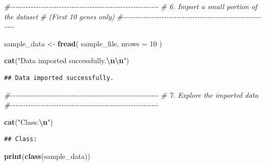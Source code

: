 \documentclass[
]{article}
\newenvironment{Shaded}{\begin{snugshade}}{\end{snugshade}}
\newcommand{\AttributeTok}[1]{\textcolor[rgb]{0.13,0.29,0.53}{#1}}
\newcommand{\CommentTok}[1]{\textcolor[rgb]{0.56,0.35,0.01}{\textit{#1}}}
\newcommand{\DecValTok}[1]{\textcolor[rgb]{0.00,0.00,0.81}{#1}}
\newcommand{\FunctionTok}[1]{\textcolor[rgb]{0.13,0.29,0.53}{\textbf{#1}}}
\newcommand{\NormalTok}[1]{#1}
\newcommand{\OtherTok}[1]{\textcolor[rgb]{0.56,0.35,0.01}{#1}}
\newcommand{\SpecialCharTok}[1]{\textcolor[rgb]{0.81,0.36,0.00}{\textbf{#1}}}
\newcommand{\StringTok}[1]{\textcolor[rgb]{0.31,0.60,0.02}{#1}}
\begin{document}
\begin{Shaded}
\begin{Highlighting}[]
\CommentTok{\#{-}{-}{-}{-}{-}{-}{-}{-}{-}{-}{-}{-}{-}{-}{-}{-}{-}{-}{-}{-}{-}{-}{-}{-}{-}{-}{-}{-}{-}{-}{-}{-}{-}{-}{-}{-}{-}{-}{-}{-}{-}{-}{-}{-}{-}{-}{-}{-}{-}{-}{-}{-}{-}{-}{-}{-}{-}{-}}
\CommentTok{\# 6. Import a small portion of the dataset}
\CommentTok{\#    (First 10 genes only)}
\CommentTok{\#{-}{-}{-}{-}{-}{-}{-}{-}{-}{-}{-}{-}{-}{-}{-}{-}{-}{-}{-}{-}{-}{-}{-}{-}{-}{-}{-}{-}{-}{-}{-}{-}{-}{-}{-}{-}{-}{-}{-}{-}{-}{-}{-}{-}{-}{-}{-}{-}{-}{-}{-}{-}{-}{-}{-}{-}{-}{-}}

\NormalTok{sample\_data }\OtherTok{\textless{}{-}} \FunctionTok{fread}\NormalTok{(}
\NormalTok{  sample\_file,}
  \AttributeTok{nrows =} \DecValTok{10}
\NormalTok{)}

\FunctionTok{cat}\NormalTok{(}\StringTok{"Data imported successfully.}\SpecialCharTok{\textbackslash{}n\textbackslash{}n}\StringTok{"}\NormalTok{)}
\end{Highlighting}
\end{Shaded}

\begin{verbatim}
## Data imported successfully.
\end{verbatim}

\begin{Shaded}
\begin{Highlighting}[]
\CommentTok{\#{-}{-}{-}{-}{-}{-}{-}{-}{-}{-}{-}{-}{-}{-}{-}{-}{-}{-}{-}{-}{-}{-}{-}{-}{-}{-}{-}{-}{-}{-}{-}{-}{-}{-}{-}{-}{-}{-}{-}{-}{-}{-}{-}{-}{-}{-}{-}{-}{-}{-}{-}{-}{-}{-}{-}{-}{-}{-}}
\CommentTok{\# 7. Explore the imported data}
\CommentTok{\#{-}{-}{-}{-}{-}{-}{-}{-}{-}{-}{-}{-}{-}{-}{-}{-}{-}{-}{-}{-}{-}{-}{-}{-}{-}{-}{-}{-}{-}{-}{-}{-}{-}{-}{-}{-}{-}{-}{-}{-}{-}{-}{-}{-}{-}{-}{-}{-}{-}{-}{-}{-}{-}{-}{-}{-}{-}{-}}

\FunctionTok{cat}\NormalTok{(}\StringTok{"Class:}\SpecialCharTok{\textbackslash{}n}\StringTok{"}\NormalTok{)}
\end{Highlighting}
\end{Shaded}

\begin{verbatim}
## Class:
\end{verbatim}

\begin{Shaded}
\begin{Highlighting}[]
\FunctionTok{print}\NormalTok{(}\FunctionTok{class}\NormalTok{(sample\_data))}
\end{Highlighting}
\end{Shaded}
\end{document}
